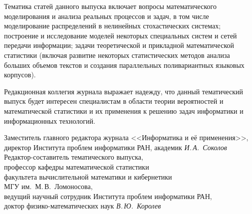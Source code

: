 {{{      Тематика статей данного выпуска включает вопросы математического 
моделирования и анализа реальных процессов и задач, в том числе моделирование 
распределений в нелинейных стохастических системах; построение и исследование 
моделей некоторых специальных систем и сетей передачи информации; задачи 
теоретической и прикладной математической статистики (включая развитие некоторых 
статистических методов анализа больших объемов текстов и создания параллельных 
поливариантных языковых корпусов). 
      
      Редакционная коллегия журнала выражает надежду, что данный тематический  
выпуск будет интересен специалистам в области теории вероятностей и математической 
статистики и их применения к решению задач информатики и информационных 
технологий.
      
      
      
      

     \vfill %
     \noindent
     Заместитель главного редактора журнала <<Информатика и её 
применения>>,\\
     директор Института проблем информатики РАН, академик  \hfill
     \textit{И.\,А.~Соколов}\\
     
     \noindent
     Редактор-составитель тематического выпуска,\\
     профессор кафедры математической статистики\\
      факультета  вычислительной математики и кибернетики\\
 МГУ им.\  М.\,В.~Ломоносова,\\
ведущий научный сотрудник Института проблем информатики РАН,\\
     доктор физико-математических наук \hfill
      \textit{В.\,Ю.~Королев}
     
     } }
     }